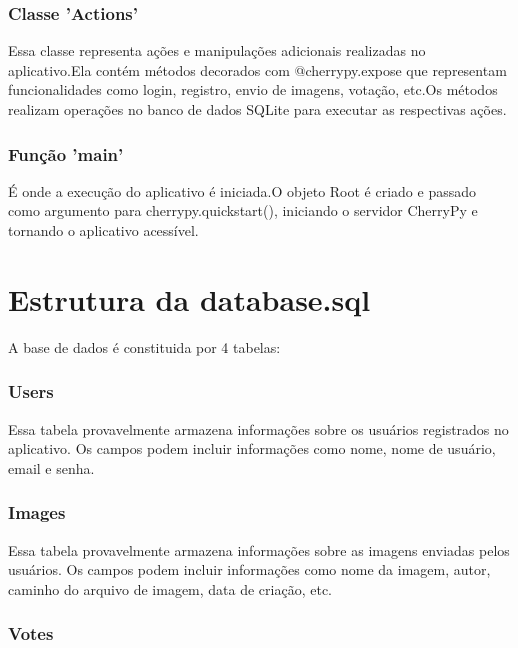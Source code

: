 \documentclass{report}
\begin{document}
\subsubsection{Classe 'Actions'}

\indent Essa classe representa ações e manipulações adicionais realizadas no aplicativo.Ela contém métodos decorados com @cherrypy.expose que representam funcionalidades como login, registro, envio de imagens, votação, etc.Os métodos realizam operações no banco de dados SQLite para executar as respectivas ações.\\

\subsubsection{Função 'main'}

\indent É onde a execução do aplicativo é iniciada.O objeto Root é criado e passado como argumento para cherrypy.quickstart(), iniciando o servidor CherryPy e tornando o aplicativo acessível.

\section {Estrutura da database.sql}

\indent A base de dados é constituida por 4 tabelas:

\subsubsection{Users}

\indent Essa tabela provavelmente armazena informações sobre os usuários registrados no aplicativo.
Os campos podem incluir informações como nome, nome de usuário, email e senha.\\

\subsubsection{Images}

\indent Essa tabela provavelmente armazena informações sobre as imagens enviadas pelos usuários.
Os campos podem incluir informações como nome da imagem, autor, caminho do arquivo de imagem, data de criação, etc.\\

\subsubsection{Votes}
\end{document}
